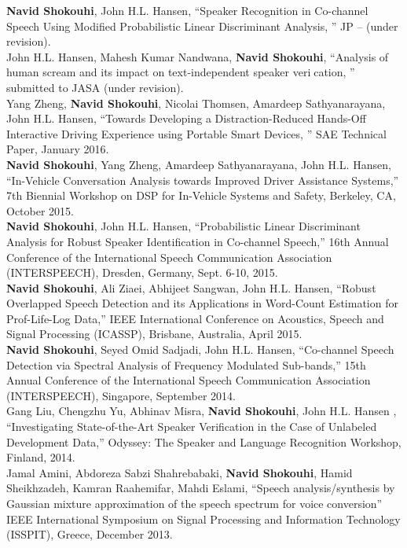 \documentclass[doublespacing]{utdthesis}
\begin{document}
\begin{vita}
{\bf Navid Shokouhi}, John H.L. Hansen, ``Speaker Recognition in Co-channel Speech Using Modified Probabilistic Linear Discriminant Analysis, '' JP -- (under revision).\\

John H.L. Hansen, Mahesh Kumar Nandwana, {\bf Navid Shokouhi}, ``Analysis of human scream
and its impact on text-independent speaker verication, '' submitted to JASA (under revision).\\

Yang Zheng, {\bf Navid Shokouhi}, Nicolai Thomsen, Amardeep Sathyanarayana, John H.L. Hansen, ``Towards Developing a Distraction-Reduced Hands-Off Interactive Driving Experience using Portable Smart Devices, '' SAE Technical Paper, January 2016. \\

{\bf Navid Shokouhi}, Yang Zheng, Amardeep Sathyanarayana, John H.L. Hansen, ``In-Vehicle Conversation Analysis towards Improved Driver Assistance Systems,'' 7th Biennial Workshop on DSP for In-Vehicle Systems and Safety, Berkeley, CA, October 2015.\\

{\bf Navid Shokouhi}, John H.L. Hansen, ``Probabilistic Linear Discriminant Analysis for Robust Speaker Identification in Co-channel Speech,'' 16th Annual Conference of the International Speech Communication Association (INTERSPEECH), Dresden, Germany, Sept. 6-10, 2015.\\

{\bf Navid Shokouhi}, Ali Ziaei, Abhijeet Sangwan, John H.L. Hansen, ``Robust Overlapped Speech Detection and its Applications in Word-Count Estimation for Prof-Life-Log Data,'' IEEE International Conference on Acoustics, Speech and Signal Processing (ICASSP), Brisbane, Australia, April 2015. \\

{\bf Navid Shokouhi}, Seyed Omid Sadjadi, John H.L. Hansen, ``Co-channel Speech Detection via Spectral Analysis of Frequency Modulated Sub-bands,'' 15th Annual Conference of the International Speech Communication Association (INTERSPEECH), Singapore, September 2014.\\

Gang Liu, Chengzhu Yu, Abhinav Misra, {\bf Navid Shokouhi}, John H.L. Hansen , ``Investigating State-of-the-Art Speaker Verification in the Case of Unlabeled Development Data,'' Odyssey: The Speaker and Language Recognition Workshop, Finland, 2014.\\

Jamal Amini, Abdoreza Sabzi Shahrebabaki, {\bf Navid Shokouhi}, Hamid Sheikhzadeh, Kamran Raahemifar, Mahdi Eslami,  ``Speech analysis/synthesis by Gaussian mixture approximation of the speech spectrum for voice conversion'' IEEE International Symposium on Signal Processing and Information Technology (ISSPIT), Greece, December 2013.\\


\end{vita}
\end{document}
